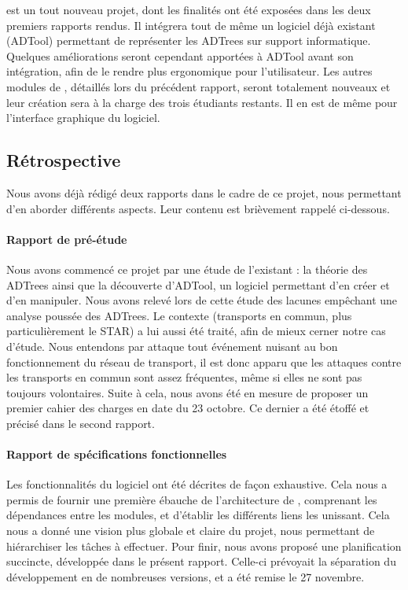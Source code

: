 	\glasir{} est un tout nouveau projet, dont les finalités ont été exposées dans les deux premiers rapports rendus. Il intégrera tout de même un logiciel déjà existant (ADTool) permettant de représenter les ADTrees sur support informatique. Quelques améliorations seront cependant apportées à ADTool avant son intégration, afin de le rendre plus ergonomique pour l'utilisateur. Les autres modules de \glasir{}, détaillés lors du précédent rapport, seront totalement nouveaux et leur création sera à la charge des trois étudiants restants. Il en est de même pour l'interface graphique du logiciel.

	\subsection{Rétrospective} 

	Nous avons déjà rédigé deux rapports dans le cadre de ce projet, nous permettant d'en aborder différents aspects. Leur contenu est brièvement rappelé ci-dessous.

	\paragraph{Rapport de pré-étude} %
	 Nous avons commencé ce projet par une étude de l'existant : la théorie des ADTrees ainsi que la découverte d'ADTool, un logiciel permettant d'en créer et d'en manipuler. Nous avons relevé lors de cette étude des lacunes empêchant une analyse poussée des ADTrees. Le contexte (transports en commun, plus particulièrement le STAR) a lui aussi été traité, afin de mieux cerner notre cas d'étude. Nous entendons par \og attaque \fg{} tout événement nuisant au bon fonctionnement du réseau de transport, il est donc apparu que les attaques contre les transports en commun sont assez fréquentes, même si elles ne sont pas toujours volontaires. Suite à cela, nous avons été en mesure de proposer un premier cahier des charges en date du 23 octobre. Ce dernier a été étoffé et précisé dans le second rapport.

	\paragraph{Rapport de spécifications fonctionnelles} %
	Les fonctionnalités du logiciel ont été décrites de façon exhaustive. Cela nous a permis de fournir une première ébauche de l'architecture de \glasir{}, comprenant les dépendances entre les modules, et d'établir les différents liens les unissant. Cela nous a donné une vision plus globale et claire du projet, nous permettant de hiérarchiser les tâches à effectuer. Pour finir, nous avons proposé une planification succincte, développée dans le présent rapport. Celle-ci prévoyait la séparation du développement en de nombreuses versions, et a été remise le 27 novembre.

